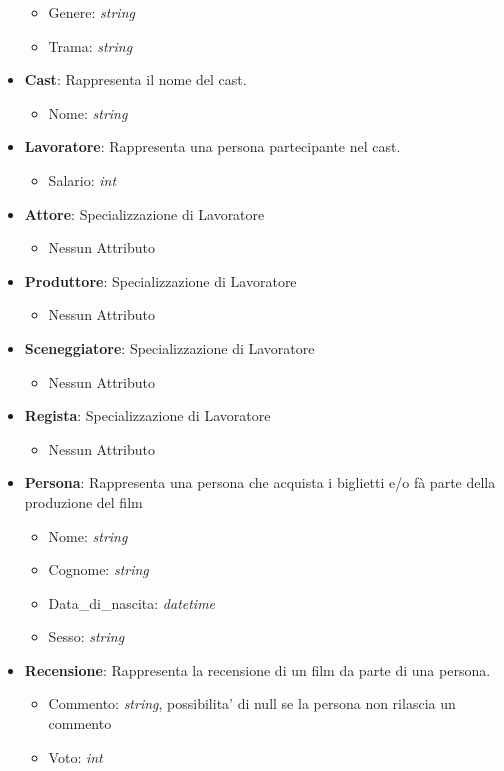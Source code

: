 \documentclass[10pt]{article}
\begin{document}
\begin{itemize}
\begin{itemize}
			\item Genere: \textit{string}
			\item Trama: \textit{string}
		\end{itemize}
		\item \textbf{Cast}: Rappresenta il nome del cast.
		\begin{itemize}
			\item Nome: \textit{string}
		\end{itemize}
		\item \textbf{Lavoratore}: Rappresenta una persona partecipante nel cast.
		\begin{itemize}
			\item Salario: \textit{int}
		\end{itemize}
		\item \textbf{Attore}: Specializzazione di Lavoratore
		\begin{itemize}
			\item Nessun Attributo
		\end{itemize}
		\item \textbf{Produttore}: Specializzazione di Lavoratore
		\begin{itemize}
			\item Nessun Attributo
		\end{itemize}
		\item \textbf{Sceneggiatore}: Specializzazione di Lavoratore
		\begin{itemize}
			\item Nessun Attributo
		\end{itemize}
		\item \textbf{Regista}: Specializzazione di Lavoratore
		\begin{itemize}
			\item Nessun Attributo
		\end{itemize}
		\item \textbf{Persona}: Rappresenta una persona che acquista i biglietti e/o fà parte della produzione del film
		\begin{itemize}
			\item Nome: \textit{string}
			\item Cognome: \textit{string}
			\item Data\_di\_nascita: \textit{datetime}	
			\item Sesso: \textit{string}
		\end{itemize}
		\item \textbf{Recensione}: Rappresenta la recensione di un film da parte di una persona.
		\begin{itemize}
			\item Commento: \textit{string}, possibilita' di null se la persona non rilascia un commento
			\item Voto: \textit{int}
		\end{itemize}
	\end{itemize}
\end{document}
